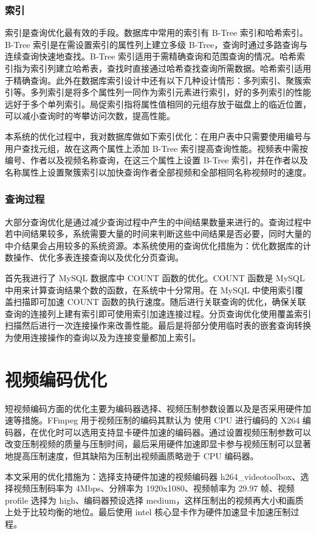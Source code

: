 \subsubsection{索引}

索引是查询优化最有效的手段。数据库中常用的索引有 B-Tree\cite{严蔚敏2002数据结构} 索引和哈希索引。B-Tree 索引是在需设置索引的属性列上建立多级 B-Tree，查询时通过多路查询与连续查询快速地查找。B-Tree 索引适用于需精确查询和范围查询的情况。哈希索引指为索引列建立哈希表，查找时直接通过哈希查找查询所需数据。哈希索引适用于精确查询。此外在数据库索引设计中还有以下几种设计情形：多列索引、聚簇索引等。多列索引是将多个属性列一同作为索引元素进行索引，好的多列索引的性能远好于多个单列索引。局促索引指将属性值相同的元组存放于磁盘上的临近位置，可以减小查询时的岑攀访问次数，提高性能。

本系统的优化过程中，我对数据库做如下索引优化：在用户表中只需要使用编号与用户查找元组，故在这两个属性上添加 B-Tree 索引提高查询性能。视频表中需按编号、作者以及视频名称查询，在这三个属性上设置 B-Tree 索引，并在作者以及名称属性上设置聚簇索引以加快查询作者全部视频和全部相同名称视频时的速度。 

\subsubsection{查询过程}

大部分查询优化是通过减少查询过程中产生的中间结果数量来进行的。查询过程中若中间结果较多，系统需要大量的时间来判断这些中间结果是否必要，同时大量的中介结果会占用较多的系统资源。本系统使用的查询优化措施为：优化数据库的计数操作、优化多表连接查询以及优化分页查询。

首先我进行了 MySQL 数据库中 COUNT 函数的优化。COUNT 函数是 MySQL 中用来计算查询结果个数的函数，在系统中十分常用。在 MySQL 中使用索引覆盖扫描即可加速 COUNT 函数的执行速度。随后进行关联查询的优化，确保关联查询的连接列上建有索引即可使用索引加速连接过程。分页查询优化使用覆盖索引扫描然后进行一次连接操作来改善性能。最后是将部分使用临时表的嵌套查询转换为使用连接操作的查询以及为连接变量都加上索引。

\section{视频编码优化}
短视频编码方面的优化主要为编码器选择、视频压制参数设置以及是否采用硬件加速等措施。FFmpeg 用于视频压制的编码其默认为 使用 CPU 进行编码的 X264 编码器，在优化时可以选用支持显卡硬件加速的编码器。通过设置视频压制参数可以改变压制视频的质量与压制时间，最后采用硬件加速即显卡参与视频压制可以显著地提高压制速度，但其缺陷为压制出视频画质略逊于 CPU 编码器。

本文采用的优化措施为：选择支持硬件加速的视频编码器 h264\_videotoolbox、选择视频压制码率为 4Mbps、分辨率为 1920x1080、视频帧率为 29.97 帧、视频 profile 选择为 high、编码器预设选择 medium，这样压制出的视频再大小和画质上处于比较均衡的地位。最后使用 intel 核心显卡作为硬件加速显卡加速压制过程。
